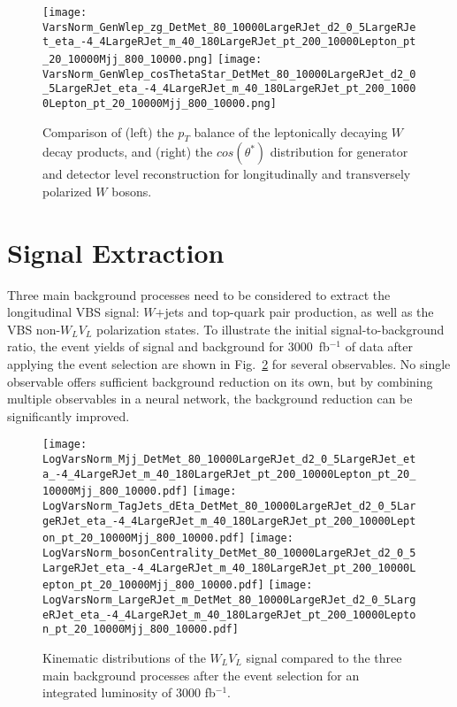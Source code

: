 \documentclass[amsmath,amssymb,aps,prd,preprint,groupedaddress]{revtex4-2}
\begin{document}
\begin{figure}[thb]
  \centering
  \texttt{[image: VarsNorm\_GenWlep\_zg\_DetMet\_80\_10000LargeRJet\_d2\_0\_5LargeRJet\_eta\_-4\_4LargeRJet\_m\_40\_180LargeRJet\_pt\_200\_10000Lepton\_pt\_20\_10000Mjj\_800\_10000.png]}
  \texttt{[image: VarsNorm\_GenWlep\_cosThetaStar\_DetMet\_80\_10000LargeRJet\_d2\_0\_5LargeRJet\_eta\_-4\_4LargeRJet\_m\_40\_180LargeRJet\_pt\_200\_10000Lepton\_pt\_20\_10000Mjj\_800\_10000.png]}
  \caption{Comparison of (left) the $p_T$ balance of the leptonically decaying $W$ decay products, and (right) the $cos(\theta^{*})$ distribution for generator and detector level reconstruction for longitudinally and transversely polarized $W$ bosons.}
  \label{fig:wlep}
\end{figure}






 
\section{Signal Extraction}
\label{sec:tagger}
Three main background processes need to be considered to extract the longitudinal VBS signal: $W$+jets and top-quark pair production, as well as the VBS non-$W_{L}V_{L}$ polarization states. To illustrate the initial signal-to-background ratio, the event yields of signal and background for 3000~fb$^{-1}$ of data after applying the event selection are shown in Fig.~\ref{fig:eventyields} for several observables.
No single observable offers sufficient background reduction on its own, but by combining multiple observables in a neural network, the background reduction can be significantly improved.


\begin{figure}[thb]
  \centering
  \texttt{[image: LogVarsNorm\_Mjj\_DetMet\_80\_10000LargeRJet\_d2\_0\_5LargeRJet\_eta\_-4\_4LargeRJet\_m\_40\_180LargeRJet\_pt\_200\_10000Lepton\_pt\_20\_10000Mjj\_800\_10000.pdf]}
  \texttt{[image: LogVarsNorm\_TagJets\_dEta\_DetMet\_80\_10000LargeRJet\_d2\_0\_5LargeRJet\_eta\_-4\_4LargeRJet\_m\_40\_180LargeRJet\_pt\_200\_10000Lepton\_pt\_20\_10000Mjj\_800\_10000.pdf]}
  \texttt{[image: LogVarsNorm\_bosonCentrality\_DetMet\_80\_10000LargeRJet\_d2\_0\_5LargeRJet\_eta\_-4\_4LargeRJet\_m\_40\_180LargeRJet\_pt\_200\_10000Lepton\_pt\_20\_10000Mjj\_800\_10000.pdf]}
  \texttt{[image: LogVarsNorm\_LargeRJet\_m\_DetMet\_80\_10000LargeRJet\_d2\_0\_5LargeRJet\_eta\_-4\_4LargeRJet\_m\_40\_180LargeRJet\_pt\_200\_10000Lepton\_pt\_20\_10000Mjj\_800\_10000.pdf]}
  \caption{Kinematic distributions of the $W_{L}V_{L}$ signal compared to the three main background processes after the event selection for an integrated luminosity of 3000 fb$^{-1}$.}
  \label{fig:eventyields}
\end{figure}
\end{document}
